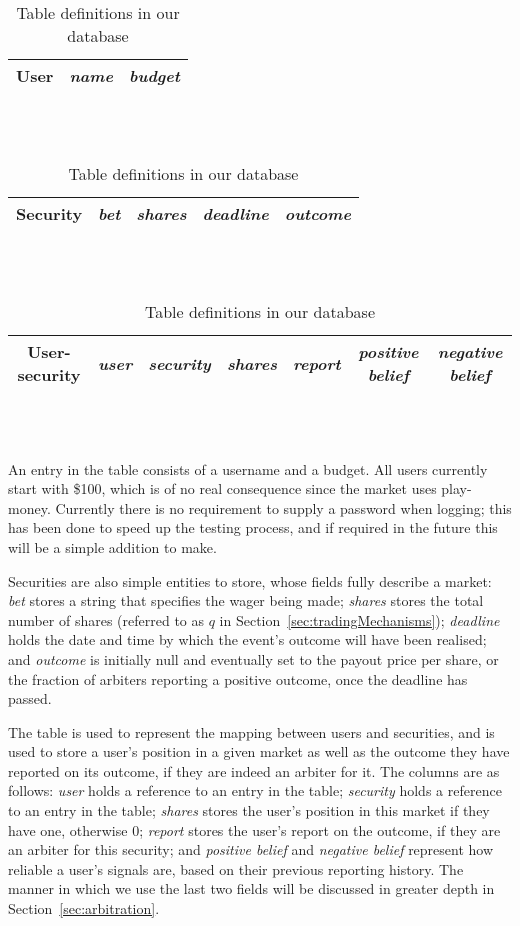 \begin{table}[ht]
	\label{tab:tableDefinitions}
	\centering
	\begin{tabular}{|c|c|c|}
		\hline
		\textbf{User} & \emph{name} & \emph{budget} \\ \hline
	\end{tabular} \\~\\

	\begin{tabular}{|c|c|c|c|c|}
		\hline
		\textbf{Security} & \emph{bet} & \emph{shares} & \emph{deadline} &
		\emph{outcome} \\ \hline
	\end{tabular} \\~\\

	\begin{tabular}{|c|c|c|c|c|c|c|}
		\hline
		\textbf{User-security} & \emph{user} & \emph{security} & \emph{shares}
		& \emph{report} & \emph{positive belief} & \emph{negative belief} \\
		\hline
	\end{tabular} \\~\\
	\caption{Table definitions in our database}
\end{table}

An entry in the  table consists of a username and a budget. All
users currently start with \$100, which is of no real consequence since the
market uses play-money. Currently there is no requirement to supply a password
when logging; this has been done to speed up the testing process, and if
required in the future this will be a simple addition to make.

Securities are also simple entities to store, whose fields fully describe a
market: \emph{bet} stores a string that specifies the wager being made;
\emph{shares} stores the total number of shares (referred to as $q$ in
Section~\ref{sec:tradingMechanisms}); \emph{deadline} holds the date and time
by which the event's outcome will have been realised; and \emph{outcome} is
initially null and eventually set to the payout price per share, or the
fraction of arbiters reporting a positive outcome, once the deadline has
passed.

The  table is used to represent the mapping between users
and securities, and is used to store a user's position in a given market as
well as the outcome they have reported on its outcome, if they are indeed an
arbiter for it. The columns are as follows: \emph{user} holds a reference to an
entry in the  table; \emph{security} holds a reference to an entry
in the  table; \emph{shares} stores the user's position in this
market if they have one, otherwise 0; \emph{report} stores the user's report on
the outcome, if they are an arbiter for this security; and \emph{positive
belief} and \emph{negative belief} represent how reliable a user's signals are,
based on their previous reporting history. The manner in which we use the last
two fields will be discussed in greater depth in Section~\ref{sec:arbitration}.

